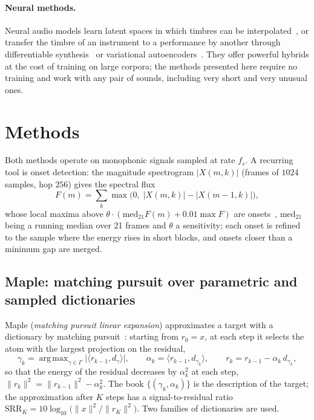 \documentclass[11pt,a4paper]{article}
\newcommand{\inner}[2]{\langle #1, #2 \rangle}
\newcommand{\norm}[1]{\lVert #1 \rVert}
\DeclareMathOperator*{\argmax}{arg\,max}
\begin{document}
\paragraph{Neural methods.} Neural audio models learn latent spaces in which
timbres can be interpolated~\cite{engel2017}, or transfer the timbre of an
instrument to a performance by another through differentiable
synthesis~\cite{engel2020} or variational
autoencoders~\cite{caillon2021}. They offer powerful hybrids at the cost of
training on large corpora; the methods presented here require no training
and work with any pair of sounds, including very short and very unusual
ones.

\section{Methods}

Both methods operate on monophonic signals sampled at rate $f_s$. A
recurring tool is onset detection: the magnitude spectrogram $|X(m,k)|$
(frames of $1024$ samples, hop $256$) gives the spectral flux
\begin{equation}
  F(m) = \sum_k \max\bigl(0,\; |X(m,k)| - |X(m-1,k)|\bigr),
\end{equation}
whose local maxima above $\theta \cdot (\mathrm{med}_{21}F(m) + 0.01 \max F)$
are onsets~\cite{bello2005,dixon2006}, $\mathrm{med}_{21}$ being a running
median over 21 frames and $\theta$ a sensitivity; each onset is refined to
the sample where the energy rises in short blocks, and onsets closer than a
minimum gap are merged.

\subsection{Maple: matching pursuit over parametric and sampled dictionaries}

Maple (\emph{matching pursuit linear expansion}) approximates a target with a
dictionary by matching pursuit~\cite{mallat1993}: starting from $r_0 = x$, at
each step it selects the atom with the largest projection on the residual,
\begin{equation}
  \gamma_k = \argmax_{\gamma \in \Gamma} \bigl|\inner{r_{k-1}}{d_\gamma}\bigr| ,
  \qquad
  \alpha_k = \inner{r_{k-1}}{d_{\gamma_k}} ,
  \qquad
  r_k = r_{k-1} - \alpha_k\, d_{\gamma_k},
\end{equation}
so that the energy of the residual decreases by $\alpha_k^2$ at each step,
$\norm{r_k}^2 = \norm{r_{k-1}}^2 - \alpha_k^2$. The book
$\{(\gamma_k, \alpha_k)\}$ is the description of the target; the
approximation after $K$ steps has a signal-to-residual ratio
$\mathrm{SRR}_K = 10 \log_{10} \bigl(\norm{x}^2 / \norm{r_K}^2\bigr)$.
Two families of dictionaries are used.
\end{document}
